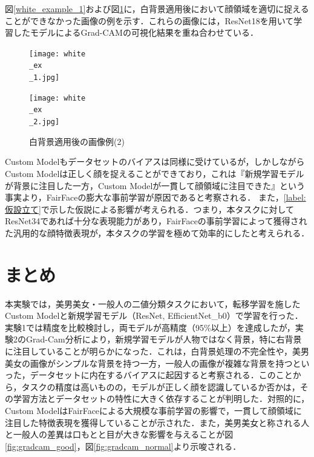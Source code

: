 \documentclass[a4paper,11pt,titlepage]{jsarticle}
\begin{document}
図\ref{white_example_1}および図\ref{white_example_2}に，白背景適用後において顔領域を適切に捉えることができなかった画像の例を示す．これらの画像には，ResNet18を用いて学習したモデルによるGrad-CAMの可視化結果を重ね合わせている．

\begin{figure}[H]
  \centering
  \begin{minipage}[b]{0.48\linewidth}
    \centering
    \texttt{[image: white\\\_ex\\\_1.jpg]}
    \caption{白背景適用後の画像例(1)}  
    \label{white_example_1}
  \end{minipage}
  \hfill
  \begin{minipage}[b]{0.48\linewidth}
    \centering
    \texttt{[image: white\\\_ex\\\_2.jpg]}
     \caption{白背景適用後の画像例(2)}   
    \label{white_example_2}
  \end{minipage}
\end{figure}


Custom Modelもデータセットのバイアスは同様に受けているが，しかしながらCustom Modelは正しく顔を捉えることができており，これは『新規学習モデルが背景に注目した一方，Custom Modelが一貫して顔領域に注目できた』という事実より，FairFaceの膨大な事前学習が原因であると考察される．
また，\ref{label:仮設立て}で示した仮説による影響が考えられる．つまり，本タスクに対してResNet34であれば十分な表現能力があり，FairFaceの事前学習によって獲得された汎用的な顔特徴表現が，本タスクの学習を極めて効率的にしたと考えられる．



\section{まとめ}
\label{label:まとめ}

本実験では，美男美女・一般人の二値分類タスクにおいて，転移学習を施したCustom Modelと新規学習モデル（ResNet, EfficientNet\_b0）で学習を行った．実験1では精度を比較検討し，両モデルが高精度（95\%以上）を達成したが，実験2のGrad-Cam分析により，新規学習モデルが人物ではなく背景，特に右背景に注目していることが明らかになった．これは，白背景処理の不完全性や，美男美女の画像がシンプルな背景を持つ一方，一般人の画像が複雑な背景を持つといった，データセットに内在するバイアスに起因すると考察される．このことから，タスクの精度は高いものの，モデルが正しく顔を認識しているか否かは，その学習方法とデータセットの特性に大きく依存することが判明した．対照的に，Custom ModelはFairFaceによる大規模な事前学習の影響で，一貫して顔領域に注目した特徴表現を獲得していることが示された．また，美男美女と称される人と一般人の差異は口もとと目が大きな影響を与えることが図\ref{fig:gradcam_good}，図\ref{fig:gradcam_normal}より示唆される．\par
\end{document}
